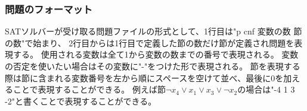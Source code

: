 \documentclass[titlepage]{jsarticle}
\begin{document}
\begin{comment}
\subsubsection{監視リテラル}
SAT solverの実行時間の70\%から90\%は単位伝播の処理で占められているため、効率良く単位節を検出することができればより高速に解を探索することができる。
素朴な方法として各変数$x_i$に対して$x_i$を含む節のリストを用意しておき、
$x_i$に値が割り当てられた時にそのリストを走査することで状態の変化した節を確認する方法がある。
しかしこの方法だとすでに充足されている節の確認を行う必要があり無駄が多くなってしまう。
監視リテラルを用いた方法は節の中の未割当な変数2つを監視する方法である。
節が単位節になる直前の状態は節中のリテラルのうち2つのみが未割当で残りのリテラルに偽が割り当てられている状態となっている。
どちらかのリテラルに偽が割り当てられた時に節は単位節となるため、
節中の全てのリテラルを監視する必要はなく未割当のリテラル2つのみを監視するだけで効率良く単位節を検出することができる。
\end{comment}



\subsubsection{問題のフォーマット}
SATソルバーが受け取る問題ファイルの形式として、1行目は"p cnf 変数の数 節の数"で始まり、
2行目からは1行目で定義した節の数だけ節が定義され問題を表現する。
使用される変数は全て1から変数の数までの番号で表現される。
変数の否定を使いたい場合はその変数に"-"をつけた形で表現される。
節を表現する際は節に含まれる変数番号を左から順にスペースを空けて並べ、最後に0を加えることで表現することができる。
例えば節$\neg x_4 \lor x_1 \lor x_3 \lor \neg x_2$の場合は"-4 1 3 -2"と書くことで表現することができる。
\end{document}

